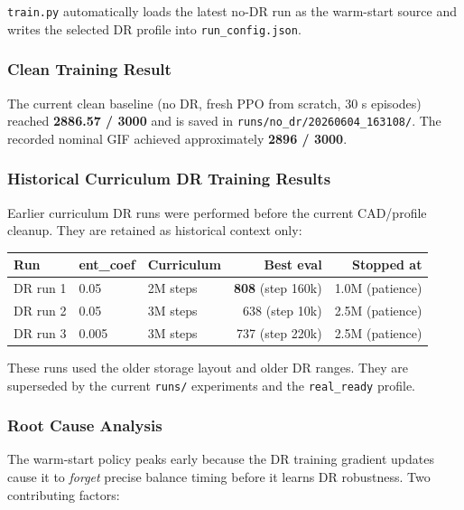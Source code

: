 \documentclass[12pt,a4paper]{article}
\begin{document}
\noindent \texttt{train.py} automatically loads the latest no-DR run as the
warm-start source and writes the selected DR profile into
\texttt{run\_config.json}.

\subsubsection{Clean Training Result}

The current clean baseline (no DR, fresh PPO from scratch, 30 s episodes)
reached \textbf{2886.57 / 3000} and is saved in
\texttt{runs/no\_dr/20260604\_163108/}.  The recorded nominal GIF achieved
approximately \textbf{2896 / 3000}.

\subsubsection{Historical Curriculum DR Training Results}

Earlier curriculum DR runs were performed before the current CAD/profile
cleanup.  They are retained as historical context only:

\begin{center}
\begin{tabular}{lllrr}
\toprule
\textbf{Run} & \textbf{ent\_coef} & \textbf{Curriculum} & \textbf{Best eval} & \textbf{Stopped at} \\
\midrule
DR run 1 & 0.05  & 2M steps & \textbf{808} (step 160k) & 1.0M (patience) \\
DR run 2 & 0.05  & 3M steps & 638 (step 10k)  & 2.5M (patience) \\
DR run 3 & 0.005 & 3M steps & 737 (step 220k) & 2.5M (patience) \\
\bottomrule
\end{tabular}
\end{center}

\noindent These runs used the older storage layout and older DR ranges.  They
are superseded by the current \texttt{runs/} experiments and the
\texttt{real\_ready} profile.

\subsubsection{Root Cause Analysis}

The warm-start policy peaks early because the DR training gradient updates
cause it to \emph{forget} precise balance timing before it learns DR robustness.
Two contributing factors:
\end{document}
